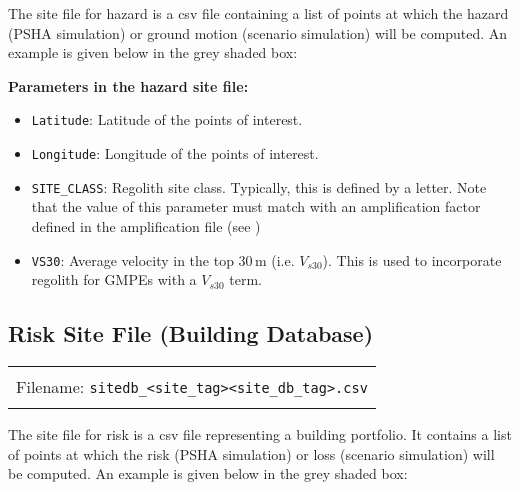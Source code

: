 The site file for hazard is a csv file containing a list of points at which the hazard (PSHA simulation)
 or ground motion (scenario simulation) will be computed. An example is
 given below in the grey shaded box:


\textbf{Parameters in the hazard site file:}
\begin{itemize}
\item \texttt{Latitude}: Latitude of the points of interest.
\item \texttt{Longitude}: Longitude of the points of interest.
\item \texttt{SITE\_CLASS}: Regolith site class. Typically, this is defined
by a letter. Note that the value of this parameter must match with
an amplification factor defined in the amplification file (see
)
\item \texttt{VS30}: Average velocity in the top 30\,m (i.e. $V_{s30}$). This is used
to incorporate regolith for GMPEs with a $V_{s30}$ term.
\end{itemize}

\subsection{Risk Site File (Building Database)}
\label{sec:grids-bdatabase}

\begin{center}
\begin{tabular}{|c|}
\hline
\\
Filename: \texttt{sitedb\_<site\_tag><site\_db\_tag>.csv} \\
\\
\hline
\end{tabular} 
\end{center}

The site file for risk is a csv file representing a building
portfolio. It contains a list of points at which the risk (PSHA simulation)
 or loss (scenario simulation) will be computed. An example is
 given below in the grey shaded box:



